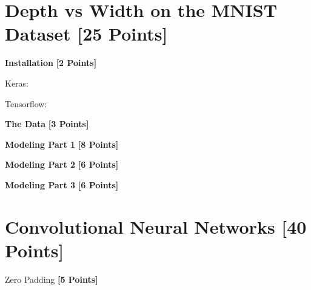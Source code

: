 \newpage
\section{Depth vs Width on the MNIST Dataset  [25 Points]}

\problem \textbf{Installation} \textbf{[2 Points]}

\begin{solution}

Keras:

Tensorflow:

\end{solution}


\problem \textbf{The Data} \textbf{[3 Points]}

\subproblem[1]

\begin{subsolution}

\end{subsolution}

\subproblem[2]
 
 \begin{subsolution}


\end{subsolution}
 
 \problem \textbf{Modeling Part 1} \textbf{[8 Points]}

\begin{solution}

\end{solution}
 
 \problem \textbf{Modeling Part 2} \textbf{[6 Points]}
 
 \begin{solution}

\end{solution}
 
  \problem \textbf{Modeling Part 3} \textbf{[6 Points]}
 
  \begin{solution}

\end{solution}
 
 \newpage
 \section{Convolutional Neural Networks  [40 Points]} 
 \problem Zero Padding \textbf{[5 Points]}

\begin{solution}

\end{solution}

